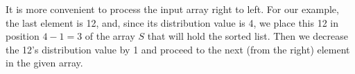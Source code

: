 \documentclass[preview]{standalone}
\begin{document}
\begin{center}
It is more convenient to process the input array right to left. For our example, the last element is 12, and, since its distribution value is 4, we place this 12 in position $4 - 1 = 3$ of the array $S$ that will hold the sorted list. Then we decrease the 12’s distribution value by 1 and proceed to the next (from the right) element in the given array.
\end{center}
\end{document}
